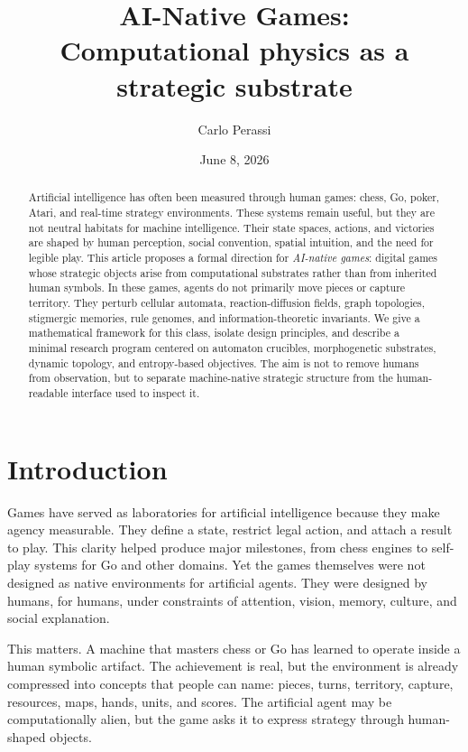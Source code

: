 \documentclass[11pt,a4paper]{article}
\title{AI-Native Games:\\Computational physics as a strategic substrate}
\author{Carlo Perassi}
\date{June 8, 2026}
\theoremstyle{plain}
\theoremstyle{definition}
\begin{document}
\maketitle

\begin{abstract}
Artificial intelligence has often been measured through human games: chess, Go, poker, Atari, and real-time strategy environments. These systems remain useful, but they are not neutral habitats for machine intelligence. Their state spaces, actions, and victories are shaped by human perception, social convention, spatial intuition, and the need for legible play. This article proposes a formal direction for \emph{AI-native games}: digital games whose strategic objects arise from computational substrates rather than from inherited human symbols. In these games, agents do not primarily move pieces or capture territory. They perturb cellular automata, reaction-diffusion fields, graph topologies, stigmergic memories, rule genomes, and information-theoretic invariants. We give a mathematical framework for this class, isolate design principles, and describe a minimal research program centered on automaton crucibles, morphogenetic substrates, dynamic topology, and entropy-based objectives. The aim is not to remove humans from observation, but to separate machine-native strategic structure from the human-readable interface used to inspect it.
\end{abstract}

\section{Introduction}\label{sec:introduction}

Games have served as laboratories for artificial intelligence because they make agency measurable. They define a state, restrict legal action, and attach a result to play. This clarity helped produce major milestones, from chess engines to self-play systems for Go and other domains. Yet the games themselves were not designed as native environments for artificial agents. They were designed by humans, for humans, under constraints of attention, vision, memory, culture, and social explanation.

This matters. A machine that masters chess or Go has learned to operate inside a human symbolic artifact. The achievement is real, but the environment is already compressed into concepts that people can name: pieces, turns, territory, capture, resources, maps, hands, units, and scores. The artificial agent may be computationally alien, but the game asks it to express strategy through human-shaped objects.
\end{document}
